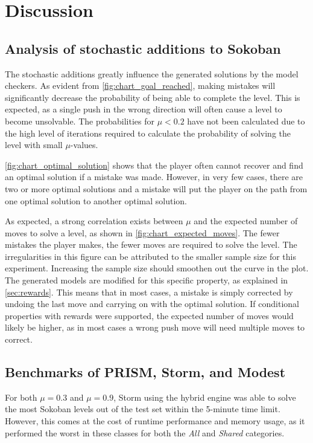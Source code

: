 \section{Discussion}

\subsection{Analysis of stochastic additions to Sokoban}
\label{sec:property_analysis}
The stochastic additions greatly influence the generated solutions by the model checkers. As evident from \autoref{fig:chart_goal_reached}, making mistakes will significantly decrease the probability of being able to complete the level. This is expected, as a single push in the wrong direction will often cause a level to become unsolvable. The probabilities for $\mu<0.2$ have not been calculated due to the high level of iterations required to calculate the probability of solving the level with small $\mu$-values.

\autoref{fig:chart_optimal_solution} shows that the player often cannot recover and find an optimal solution if a mistake was made. However, in very few cases, there are two or more optimal solutions and a mistake will put the player on the path from one optimal solution to another optimal solution. 

As expected, a strong correlation exists between $\mu$ and the expected number of moves to solve a level, as shown in \autoref{fig:chart_expected_moves}. The fewer mistakes the player makes, the fewer moves are required to solve the level. The irregularities in this figure can be attributed to the smaller sample size for this experiment. Increasing the sample size should smoothen out the curve in the plot. The generated models are modified for this specific property, as explained in \autoref{sec:rewards}. This means that in most cases, a mistake is simply corrected by undoing the last move and carrying on with the optimal solution. If conditional properties with rewards were supported, the expected number of moves would likely be higher, as in most cases a wrong push move will need multiple moves to correct. 

\subsection{Benchmarks of PRISM, Storm, and Modest}
For both $\mu=0.3$ and $\mu=0.9$, Storm using the hybrid engine was able to solve the most Sokoban levels out of the test set within the 5-minute time limit. However, this comes at the cost of runtime performance and memory usage, as it performed the worst in these classes for both the \textit{All} and \textit{Shared} categories.

